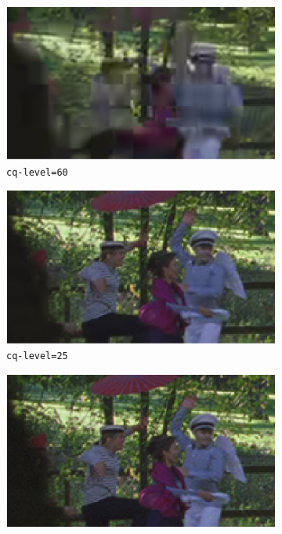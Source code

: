 \begin{figure}[!htpb]
    \centering 
        \begin{subfigure}[c]{\textwidth}
            \centering
            \includegraphics[height=0.25\textheight]{Sections/3Transforms/Images/lowParkDetail.png}
            \caption{\texttt{cq-level=60}}
            \label{subfig:lowq}
        \end{subfigure}
        \begin{subfigure}[c]{\textwidth}
            \centering
            \includegraphics[height=0.25\textheight]{Sections/3Transforms/Images/medParkDetail.png}
            \caption{\texttt{cq-level=25}}
            \label{subfig:medq}
        \end{subfigure}
        \begin{subfigure}[c]{\textwidth}
            \centering
            \includegraphics[height=0.25\textheight]{Sections/3Transforms/Images/highParkDetail.png}

\end{subfigure}
\end{figure}
